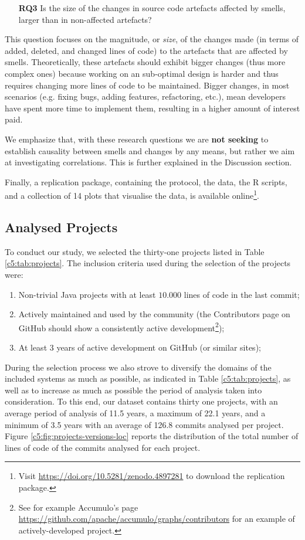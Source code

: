 \begin{itemize}
    \item[\textbf{RQ3}] Is the size of the changes in source code artefacts affected by smells, larger than in non-affected artefacts?
\end{itemize}
This question focuses on the magnitude, or \emph{size}, of the changes made (in terms of added, deleted, and changed lines of code) to the artefacts that are affected by smells. Theoretically, these artefacts should exhibit bigger changes (thus more complex ones) because working on an sub-optimal design is harder and thus requires changing more lines of code to be maintained.
Bigger changes, in most scenarios (e.g. fixing bugs, adding features, refactoring, etc.), mean developers have spent more time to implement them, resulting in a higher amount of interest paid\cite{ElEmam2000, Mockus2000}.

We emphasize that, with these research questions we are \textbf{not seeking} to establish causality between smells and changes by any means, but rather we aim at investigating correlations. This is further explained in the Discussion section.

Finally, a replication package, containing the protocol, the data, the R scripts, and a collection of 14 plots that visualise the data, is available online\footnote{\label{ftn:repl-package}Visit \url{https://doi.org/10.5281/zenodo.4897281} to download the replication package.}.

\subsection{Analysed Projects}
To conduct our study, we selected the thirty-one projects listed in Table \ref{c5:tab:projects}. 
The inclusion criteria used during the selection of the projects were:
\begin{enumerate}
    \item Non-trivial Java projects with at least $10.000$ lines of code in the last commit; 
    \item Actively maintained and used by the community (the Contributors page on GitHub should show a consistently active development\footnote{See for example Accumulo's page \url{https://github.com/apache/accumulo/graphs/contributors} for an example of actively-developed project.});
    \item At least 3 years of active development on GitHub (or similar sites);
\end{enumerate}
During the selection process we also strove to diversify the domains of the included systems as much as possible, as indicated in Table \ref{c5:tab:projects}, as well as to increase as much as possible the period of analysis taken into consideration.
To this end, our dataset contains thirty one projects, with an average period of analysis of 11.5 years, a maximum of 22.1 years, and a minimum of 3.5 years with an average of 126.8 commits analysed per project.
Figure \ref{c5:fig:projects-versions-loc} reports the distribution of the total number of lines of code of the commits analysed for each project.

